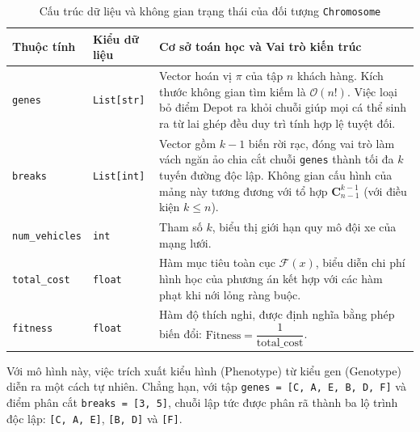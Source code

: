 \documentclass[12pt,a4paper]{article}
\numberwithin{figure}{subsection}
\renewcommand{\le}{\leqslant}
\begin{document}
\begin{table}[H]
    \centering
    \caption{Cấu trúc dữ liệu và không gian trạng thái của đối tượng \texttt{Chromosome}}
    \label{tab:chromosome_attrs}
    \renewcommand{\arraystretch}{1.5}
    \begin{tabular}{|l|l|p{8.5cm}|}
        \hline
        \textbf{Thuộc tính} & \textbf{Kiểu dữ liệu} & \textbf{Cơ sở toán học và Vai trò kiến trúc} \\
        \hline
        \texttt{genes} & \texttt{List[str]} & Vector hoán vị $\pi$ của tập $n$ khách hàng. Kích thước không gian tìm kiếm là $\mathcal{O}(n!)$. Việc loại bỏ điểm Depot ra khỏi chuỗi giúp mọi cá thể sinh ra từ lai ghép đều duy trì tính hợp lệ tuyệt đối. \\
        \hline
        \texttt{breaks} & \texttt{List[int]} & Vector gồm $k-1$ biến rời rạc, đóng vai trò làm vách ngăn ảo chia cắt chuỗi \texttt{genes} thành tối đa $k$ tuyến đường độc lập. Không gian cấu hình của mảng này tương đương với tổ hợp $\mathbf{C}_{n-1}^{k-1}$ (với điều kiện $k \le n$). \\
        \hline
        \texttt{num\_vehicles} & \texttt{int} & Tham số $k$, biểu thị giới hạn quy mô đội xe của mạng lưới. \\
        \hline
        \texttt{total\_cost} & \texttt{float} & Hàm mục tiêu toàn cục $\mathcal{F}(x)$, biểu diễn chi phí hình học của phương án kết hợp với các hàm phạt khi nới lỏng ràng buộc. \\
        \hline
        \texttt{fitness} & \texttt{float} & Hàm độ thích nghi, được định nghĩa bằng phép biến đổi: $\text{Fitness} = \dfrac{1}{\text{total\_cost}}$. \\
        \hline
    \end{tabular}
\end{table}

Với mô hình này, việc trích xuất kiểu hình (Phenotype) từ kiểu gen (Genotype) diễn ra một cách tự nhiên. Chẳng hạn, với tập \texttt{genes = [C, A, E, B, D, F]} và điểm phân cắt \texttt{breaks = [3, 5]}, chuỗi lập tức được phân rã thành ba lộ trình độc lập: \texttt{[C, A, E]}, \texttt{[B, D]} và \texttt{[F]}. 
\end{document}
